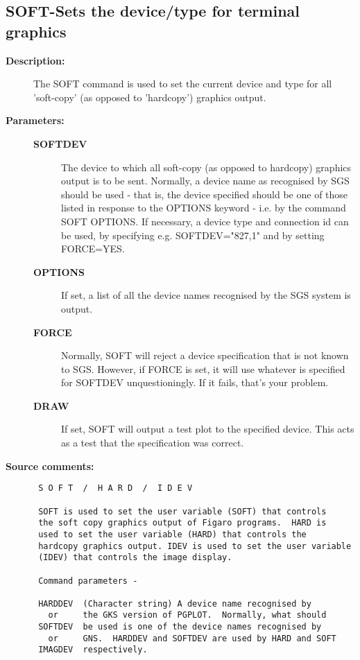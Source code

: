 \subsection{SOFT-\label{SOFT}Sets the device/type for terminal graphics}
\begin{description}

\item [{\bf Description:}]
 The SOFT command is used to set the current device and type
 for all 'soft-copy' (as opposed to 'hardcopy') graphics output.

\item [{\bf Parameters:}]
\begin{description}
\item [{\bf SOFTDEV}]
 The device to which all
 soft-copy (as opposed to hardcopy) graphics output
 is to be sent.  Normally, a device name as recognised
 by SGS should be used - that is, the device specified
 should be one of those listed in response to the
 OPTIONS keyword - i.e. by the command SOFT OPTIONS.
 If necessary, a device type and connection id can
 be used, by specifying e.g. SOFTDEV="827,1" and by
 setting FORCE=YES.
\item [{\bf OPTIONS}]
 If set, a list of all the device names recognised
 by the SGS system is output.
\item [{\bf FORCE}]
 Normally, SOFT will reject a device specification
 that is not known to SGS.  However, if FORCE is set,
 it will use whatever is specified for SOFTDEV
 unquestioningly.  If it fails, that's your problem.
\item [{\bf DRAW}]
 If set, SOFT will output a test plot to the specified
 device.  This acts as a test that the specification
 was correct.
\end{description}

\item [{\bf Source comments:}]
\begin{verbatim}
 S O F T  /  H A R D  /  I D E V

 SOFT is used to set the user variable (SOFT) that controls
 the soft copy graphics output of Figaro programs.  HARD is
 used to set the user variable (HARD) that controls the
 hardcopy graphics output. IDEV is used to set the user variable
 (IDEV) that controls the image display.

 Command parameters -

 HARDDEV  (Character string) A device name recognised by
   or     the GKS version of PGPLOT.  Normally, what should
 SOFTDEV  be used is one of the device names recognised by
   or     GNS.  HARDDEV and SOFTDEV are used by HARD and SOFT
 IMAGDEV  respectively.


\end{verbatim}
\end{description}
